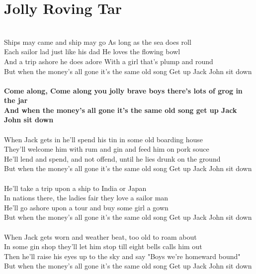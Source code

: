 \documentclass[letterpaper,14pt]{extarticle}
\begin{document}
\section{Jolly Roving Tar}
\noindent
\\Ships may came and ship may go As long as the sea does roll
\\Each sailor lad just like his dad He loves the flowing bowl
\\And a trip ashore he does adore With a girl that's plump and round 
\\But when the money's all gone it's the same old song Get up Jack John sit down
\\
\\\textbf{Come along, Come along you jolly brave boys there’s lots of grog in the jar
\\And when the money's all gone it's the same old song get up Jack John sit down}
\\
\\When Jack gets in he'll spend his tin in some old boarding house
\\They'll welcome him with rum and gin and feed him on pork souce
\\He'll lend and spend, and not offend, until he lies drunk on the ground
\\But when the money's all gone it's the same old song Get up Jack John sit down
\\
\\He'll take a trip upon a ship to India or Japan
\\In nations there, the ladies fair they love a sailor man
\\He'll go ashore upon a tour and buy some girl a gown
\\But when the money's all gone it's the same old song Get up Jack John sit down
\\
\\When Jack gets worn and weather beat, too old to roam about
\\In some gin shop they'll let him stop till eight bells calls him out
\\Then he'll raise his eyes up to the sky and say "Boys we're homeward bound"
\\But when the money's all gone it's the same old song Get up Jack John sit down
\end{document}
